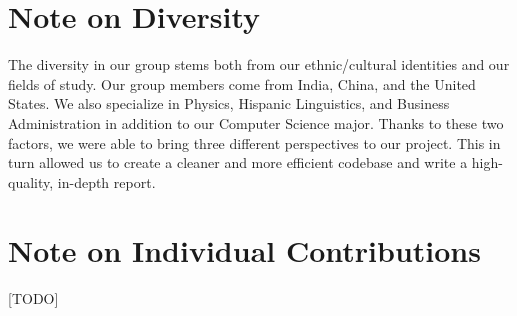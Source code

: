 \documentclass[11pt]{article}
\begin{document}
\section*{Note on Diversity}
The diversity in our group stems both from our ethnic/cultural identities and our fields of study. Our group members come from India, China, and the United States. We also specialize in Physics, Hispanic Linguistics, and Business Administration in addition to our Computer Science major. Thanks to these two factors, we were able to bring three different perspectives to our project. This in turn allowed us to create a cleaner and more efficient codebase and write a high-quality, in-depth report.

\section*{Note on Individual Contributions}
[TODO]

%

\end{document}
